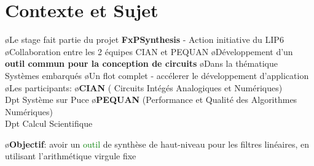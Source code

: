 \section{Contexte et Sujet}

\begin{frame} 
    \BI
    \o Le stage fait partie du projet \textbf{FxPSynthesis} - Action initiative du LIP6
       \BI
       \o Collaboration entre les 2 équipes CIAN et PEQUAN
       \o Développement d'un \textbf{outil commun pour la conception de circuits}
       \o Dans la thématique Systèmes embarqués
       \o Un flot complet - accélerer le développement d'application 
       \EI
	\smallskip
    \o Les participants:
		\BI
		\o \textbf{CIAN} ( Circuits Intégés Analogiques et Numériques) \\ \hspace{1cm}Dpt Système sur Puce
		\o \textbf{PEQUAN} (Performance et Qualité des Algorithmes Numériques) \\ \hspace{1cm}Dpt Calcul Scientifique
		\EI
    \EI
{}
\end{frame} 
\begin{frame} 
    \BI
    \o \textbf{Objectif}: avoir un \textcolor{green}{outil} de synthèse de haut-niveau pour les filtres linéaires, en utilisant l'arithmétique virgule fixe 
	\vspace{0.7cm}
	\begin{center}
	\end{center}			
	\EI
\end{frame}	
